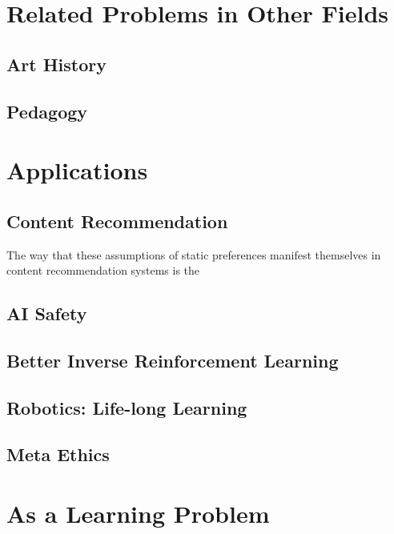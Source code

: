 \documentclass{book}
\begin{document}
	
	\section{Related Problems in Other Fields}
	
	\subsection{Art History} %
	\subsection{Pedagogy} %
	\subsection{}
	
	
	\section{Applications}
	
	\subsection{Content Recommendation}
	The way that these assumptions of static preferences manifest themselves in content recommendation systems is the
	
	\subsection{AI Safety}
	\subsection{Better Inverse Reinforcement Learning}
	\subsection{Robotics: Life-long Learning}
	\subsection{Meta Ethics}
	
	\section{As a Learning Problem}
	
	\nocite{*}
	
	
\end{document}
